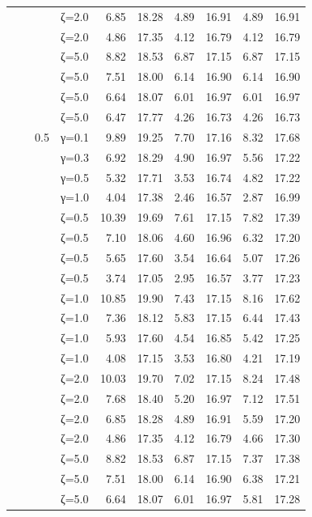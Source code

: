 \begin{table}[htbp]
\begin{tabular}{ll r l  rr  rr  rr}
  &  &  & ζ=2.0 & 6.85 & 18.28 & 4.89 & 16.91 & 4.89 & 16.91 \\
  &  &  & ζ=2.0 & 4.86 & 17.35 & 4.12 & 16.79 & 4.12 & 16.79 \\
  &  &  & ζ=5.0 & 8.82 & 18.53 & 6.87 & 17.15 & 6.87 & 17.15 \\
  &  &  & ζ=5.0 & 7.51 & 18.00 & 6.14 & 16.90 & 6.14 & 16.90 \\
  &  &  & ζ=5.0 & 6.64 & 18.07 & 6.01 & 16.97 & 6.01 & 16.97 \\
  &  &  & ζ=5.0 & 6.47 & 17.77 & 4.26 & 16.73 & 4.26 & 16.73 \\
  &  & 0.5 & γ=0.1 & 9.89 & 19.25 & 7.70 & 17.16 & 8.32 & 17.68 \\
  &  &  & γ=0.3 & 6.92 & 18.29 & 4.90 & 16.97 & 5.56 & 17.22 \\
  &  &  & γ=0.5 & 5.32 & 17.71 & 3.53 & 16.74 & 4.82 & 17.22 \\
  &  &  & γ=1.0 & 4.04 & 17.38 & 2.46 & 16.57 & 2.87 & 16.99 \\
  &  &  & ζ=0.5 & 10.39 & 19.69 & 7.61 & 17.15 & 7.82 & 17.39 \\
  &  &  & ζ=0.5 & 7.10 & 18.06 & 4.60 & 16.96 & 6.32 & 17.20 \\
  &  &  & ζ=0.5 & 5.65 & 17.60 & 3.54 & 16.64 & 5.07 & 17.26 \\
  &  &  & ζ=0.5 & 3.74 & 17.05 & 2.95 & 16.57 & 3.77 & 17.23 \\
  &  &  & ζ=1.0 & 10.85 & 19.90 & 7.43 & 17.15 & 8.16 & 17.62 \\
  &  &  & ζ=1.0 & 7.36 & 18.12 & 5.83 & 17.15 & 6.44 & 17.43 \\
  &  &  & ζ=1.0 & 5.93 & 17.60 & 4.54 & 16.85 & 5.42 & 17.25 \\
  &  &  & ζ=1.0 & 4.08 & 17.15 & 3.53 & 16.80 & 4.21 & 17.19 \\
  &  &  & ζ=2.0 & 10.03 & 19.70 & 7.02 & 17.15 & 8.24 & 17.48 \\
  &  &  & ζ=2.0 & 7.68 & 18.40 & 5.20 & 16.97 & 7.12 & 17.51 \\
  &  &  & ζ=2.0 & 6.85 & 18.28 & 4.89 & 16.91 & 5.59 & 17.20 \\
  &  &  & ζ=2.0 & 4.86 & 17.35 & 4.12 & 16.79 & 4.66 & 17.30 \\
  &  &  & ζ=5.0 & 8.82 & 18.53 & 6.87 & 17.15 & 7.37 & 17.38 \\
  &  &  & ζ=5.0 & 7.51 & 18.00 & 6.14 & 16.90 & 6.38 & 17.21 \\
  &  &  & ζ=5.0 & 6.64 & 18.07 & 6.01 & 16.97 & 5.81 & 17.28 \\

\end{tabular}
\end{table}
